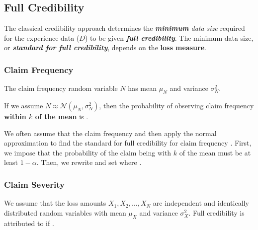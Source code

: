 \documentclass[english]{article}
\begin{document}
\begin{multicols*}{2}
\subsection{Full Credibility}\label{subsec:FullCred}
\begin{rappel_enhanced}[Contexte]
The classical credibility approach determines the \textit{\textbf{minimum} data size} required for the experience data ($D$) to be given \textbf{\textit{full credibility}}. The minimum data size, or \textit{\textbf{standard for full credibility}}, depends on the \textbf{loss measure}.
\end{rappel_enhanced}


\subsubsection{Claim Frequency}
The claim frequency random variable $N$ has mean $\mu_{N}$ and variance $\sigma^{2}_{N}$. 

If we assume $N \approx \mathcal{N}(\mu_{N}, \sigma^{2}_{N})$, then the probability of observing claim frequency \textbf{within $k$ of the mean} is .

\bigskip

We often assume that the claim frequency  and then apply the normal approximation to find the standard for full credibility for claim frequency . First, we impose that the probability of the claim being with $k$ of the mean must be at least $1 - \alpha$. Then, we rewrite  and set  where .


\subsubsection{Claim Severity}
We assume that the loss amounts $X_{1}, X_{2}, \dots, X_{N}$ are independent and identically distributed random variables with mean $\mu_{X}$ and variance $\sigma^{2}_{X}$. Full credibility is attributed to  if . 


\end{multicols*}
\end{document}
